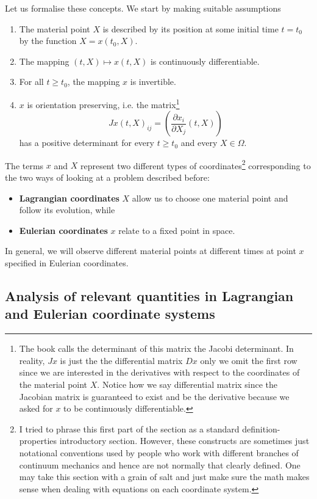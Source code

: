 Let us formalise these concepts. We start by making suitable assumptions
\begin{enumerate}
  \item The material point $X$ is described by its position at some initial
    time $t = t_0$ by the function $X = x(t_0, X)$.
  \item The mapping $(t, X) \mapsto x(t, X)$ is continuously differentiable.
  \item For all $t \geq t_0$, the mapping $x$ is invertible.
  \item $x$ is orientation preserving, i.e. the matrix\footnote{The book
      \cite[p. 207]{eck2017mathematical} calls the determinant of this matrix
      the Jacobi determinant. In reality, $Jx$ is just the the differential
      matrix $Dx$ only we omit the first row since we are interested in the
      derivatives with respect to the coordinates of the material point $X$.
      Notice how we say differential matrix since the Jacobian matrix is
      guaranteed to exist and be the derivative because we asked for $x$ to be
      continuously differentiable.}
    \[
      Jx(t, X)_{ij} = \left( \frac{\partial x_i}{\partial X_j} (t, X) \right)
    \]
    has a positive determinant for every $t \geq t_0$ and every $X \in \Omega$.
\end{enumerate}

The terms $x$ and $X$ represent two different types of coordinates\footnote{I
tried to phrase this first part of the section as a standard
definition-properties introductory section. However, these constructs are
sometimes just notational conventions used by people who work with different
branches of continuum mechanics and hence are not normally that clearly
defined. One may take this section with a grain of salt and just make sure the
math makes sense when dealing with equations on each coordinate system.}
corresponding to the two ways of looking at a problem described before:
\begin{itemize}
  \item \textbf{Lagrangian coordinates} $X$ allow us to choose one material point and
    follow its evolution, while
  \item \textbf{Eulerian coordinates} $x$ relate to a fixed point in space.
\end{itemize}

In general, we will observe different material points at different times at
point $x$ specified in Eulerian coordinates.

\subsection{Analysis of relevant quantities in Lagrangian and Eulerian coordinate systems}

